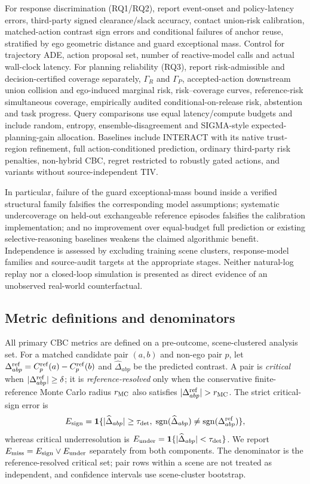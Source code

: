 \documentclass[10pt]{article}
\begin{document}
For response discrimination (RQ1/RQ2), report event-onset and policy-latency errors, third-party signed clearance/slack accuracy, contact union-risk calibration, matched-action contrast sign errors and conditional failures of anchor reuse, stratified by ego geometric distance and guard exceptional mass. Control for trajectory ADE, action proposal set, number of reactive-model calls and actual wall-clock latency. For planning reliability (RQ3), report risk-admissible and decision-certified coverage separately, $\Gamma_R$ and $\Gamma_P$, accepted-action downstream union collision and ego-induced marginal risk, risk--coverage curves, reference-risk simultaneous coverage, empirically audited conditional-on-release risk, abstention and task progress. Query comparisons use equal latency/compute budgets and include random, entropy, ensemble-disagreement and SIGMA-style expected-planning-gain allocation. Baselines include INTERACT with its native trust-region refinement, full action-conditioned prediction, ordinary third-party risk penalties, non-hybrid CBC, regret restricted to robustly gated actions, and variants without source-independent TIV.

In particular, failure of the guard exceptional-mass bound inside a verified structural family falsifies the corresponding model assumptions; systematic undercoverage on held-out exchangeable reference episodes falsifies the calibration implementation; and no improvement over equal-budget full prediction or existing selective-reasoning baselines weakens the claimed algorithmic benefit. Independence is assessed by excluding training scene clusters, response-model families and source-audit targets at the appropriate stages. Neither natural-log replay nor a closed-loop simulation is presented as direct evidence of an unobserved real-world counterfactual.

\subsection{Metric definitions and denominators}
\label{sec:metricdefs}
All primary CBC metrics are defined on a pre-outcome, scene-clustered
analysis set.  For a matched candidate pair $(a,b)$ and non-ego pair $p$, let
$\Delta^{\rm ref}_{abp}=C_p^{\rm ref}(a)-C_p^{\rm ref}(b)$ and
$\widehat\Delta_{abp}$ be the predicted contrast.  A pair is \emph{critical}
when $|\Delta^{\rm ref}_{abp}|\ge\delta$; it is \emph{reference-resolved}
only when the conservative finite-reference Monte Carlo radius $r_{\rm MC}$
also satisfies $|\Delta^{\rm ref}_{abp}|>r_{\rm MC}$.  The strict critical-sign
error is
\[
 E_{\rm sign}=\mathbf 1\{ |\widehat\Delta_{abp}|\ge\tau_{\rm det},\;
 \operatorname{sgn}(\widehat\Delta_{abp})\ne
 \operatorname{sgn}(\Delta^{\rm ref}_{abp})\},
\]
whereas critical underresolution is
$E_{\rm under}=\mathbf 1\{|\widehat\Delta_{abp}|<\tau_{\rm det}\}$.
We report $E_{\rm miss}=E_{\rm sign}\lor E_{\rm under}$ separately from both
components.  The denominator is the reference-resolved critical set; pair
rows within a scene are not treated as independent, and confidence intervals
use scene-cluster bootstrap.
\end{document}
